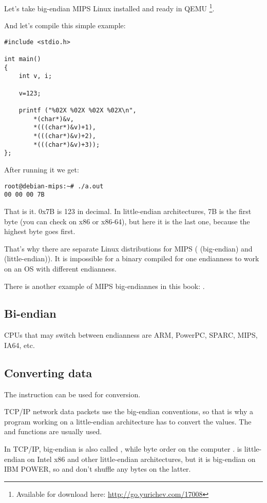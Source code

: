 Let's take big-endian MIPS Linux installed and ready in QEMU
\footnote{Available for download here: \url{http://go.yurichev.com/17008}}.

And let's compile this simple example:

\begin{lstlisting}[style=customc]
#include <stdio.h>

int main()
{
	int v, i;

	v=123;

	printf ("%02X %02X %02X %02X\n", 
		*(char*)&v,
		*(((char*)&v)+1),
		*(((char*)&v)+2),
		*(((char*)&v)+3));
};
\end{lstlisting}

After running it we get:

\begin{lstlisting}
root@debian-mips:~# ./a.out 
00 00 00 7B
\end{lstlisting}

That is it.
0x7B is 123 in decimal.
In little-endian architectures, 7B is the first byte (you can check on x86 or x86-64), 
but here it is the last one, because the highest byte goes first.

That's why there are separate Linux distributions for MIPS
( (big-endian) and  (little-endian)).
It is impossible for a binary compiled for one endianness to work on an \ac{OS} with different endianness. 

There is another example of MIPS big-endiannes in this book: .

\subsection{Bi-endian}

CPUs that may switch between endianness are ARM, PowerPC, SPARC, MIPS, \ac{IA64}, etc.

\subsection{Converting data}

The  instruction can be used for conversion.

TCP/IP network data packets use the big-endian conventions, so that is why a program working on a little-endian architecture
has to convert the values.
The  and  functions are usually used.

In TCP/IP, big-endian is also called , while byte order on the computer .
 is little-endian on Intel x86 and other little-endian architectures,
but it is big-endian on IBM POWER, so  and  don't shuffle any bytes on the latter.


